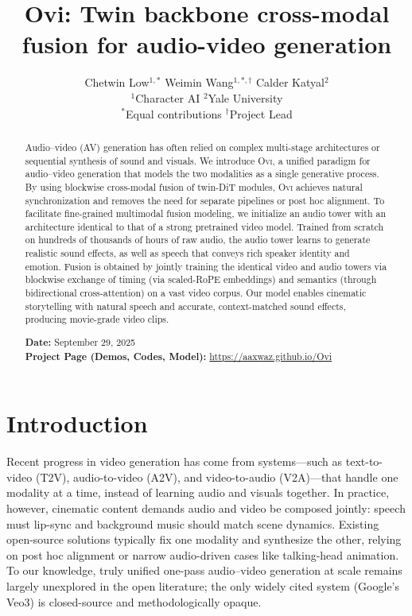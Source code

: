 \documentclass{article} %
\title{Ovi: Twin backbone cross-modal fusion for audio-video generation}
\author{
Chetwin Low$^{1,\ast}$ \quad
Weimin Wang$^{1,\ast,\dagger}$ \quad
Calder Katyal$^{2}$ \\
$^{1}$Character AI \quad $^{2}$Yale University \\
$^{\ast}$Equal contributions \quad
$^{\dagger}$Project Lead 
}
\begin{document}
\maketitle

\begin{abstract}
Audio–video (AV) generation has often relied on complex multi-stage architectures or sequential synthesis of sound and visuals. We introduce \textsc{Ovi}, a unified paradigm for audio–video generation that models the two modalities as a single generative process. By using blockwise cross-modal fusion of twin-DiT modules, \textsc{Ovi} achieves natural synchronization and removes the need for separate pipelines or post hoc alignment. To facilitate fine-grained multimodal fusion modeling, we initialize an audio tower with an architecture identical to that of a strong pretrained video model. Trained from scratch on hundreds of thousands of hours of raw audio, the audio tower learns to generate realistic sound effects, as well as speech that conveys rich speaker identity and emotion. Fusion is obtained by jointly training the identical video and audio towers via blockwise exchange of timing (via scaled-RoPE embeddings) and semantics (through bidirectional cross-attention) on a vast video corpus. Our model enables cinematic storytelling with natural speech and accurate, context-matched sound effects, producing movie-grade video clips. 

\vspace{0.5em}
\textbf{Date:} September 29, 2025\\
\textbf{Project Page (Demos, Codes, Model):} \href{https://aaxwaz.github.io/Ovi}{https://aaxwaz.github.io/Ovi}
\end{abstract}

\vspace{1em}

\maketitle

\section{Introduction}

Recent progress in video generation has come from systems—such as text-to-video (T2V), audio-to-video (A2V), and video-to-audio (V2A)—that handle one modality at a time, instead of learning audio and visuals together. In practice, however, cinematic content demands audio and video be composed jointly: speech must lip-sync and background music should match scene dynamics. Existing open-source solutions typically fix one modality and synthesize the other, relying on post hoc alignment or narrow audio-driven cases like talking-head animation. To our knowledge, truly unified one-pass audio–video generation at scale remains largely unexplored in the open literature; the only widely cited system (Google’s Veo3) is closed-source and methodologically opaque.
\end{document}
